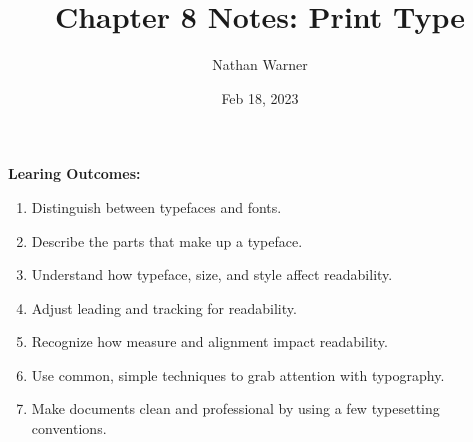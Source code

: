 \documentclass{report}
\title{\Huge{Chapter 8 Notes: Print Type}}
\author{\huge{Nathan Warner}}
\date{\huge{Feb 18, 2023}}
\begin{document}
    \maketitle
    \begin{Large}
        \noindent \textbf{Learing Outcomes:}
    \end{Large}
    \bigbreak \noindent 
    \begin{enumerate}
        \item Distinguish between typefaces and fonts.
        \item Describe the parts that make up a typeface.
        \item Understand how typeface, size, and style affect readability.
        \item Adjust leading and tracking for readability.
        \item Recognize how measure and alignment impact readability.
        \item Use common, simple techniques to grab attention with typography.
        \item Make documents clean and professional by using a few typesetting conventions.
    \end{enumerate} 
    
\end{document}
